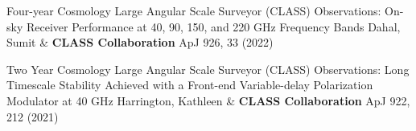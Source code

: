 \begin{etaremune}[topsep=0pt,itemsep=0pt,partopsep=0pt,parsep=0pt]
            {Four-year Cosmology Large Angular Scale Surveyor (CLASS) Observations: On-sky Receiver Performance at 40, 90, 150, and 220 GHz Frequency Bands}
            {Dahal, Sumit \& \textbf{CLASS Collaboration}}
            {ApJ 926, 33 (2022)}

            {Two Year Cosmology Large Angular Scale Surveyor (CLASS) Observations: Long Timescale Stability Achieved with a Front-end Variable-delay Polarization Modulator at 40 GHz}
            {Harrington, Kathleen \& \textbf{CLASS Collaboration}}
            {ApJ 922, 212 (2021)}

\end{etaremune}
